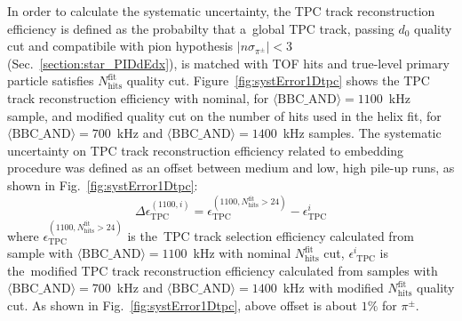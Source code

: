 In order to calculate the systematic uncertainty, the TPC track reconstruction efficiency is defined  as the probabilty that a~global TPC track, passing $d_0$ quality cut and compatibile with pion hypothesis $|n\sigma_{\pi^\pm}| < 3$ (Sec.~\ref{section:star_PIDdEdx}), is
matched with TOF hits and true-level primary particle satisfies $N^\textrm{fit}_\textrm{hits}$ quality cut. Figure~\ref{fig:systError1Dtpc} shows the TPC track reconstruction efficiency with nominal, for $\langle \textrm{BBC\_AND}\rangle=1100$~kHz sample, and modified quality cut on the  number of hits used in the helix fit, for $\langle\text{BBC\_AND}\rangle=700$~kHz and $\langle\text{BBC\_AND}\rangle=1400$~kHz  samples.
The systematic uncertainty on TPC track reconstruction efficiency related to embedding procedure was defined as an offset between medium and low, high pile-up runs, as shown in Fig.~\ref{fig:systError1Dtpc}:
\begin{equation}
\Delta\epsilon_\textrm{TPC}^{\left(1100,i\right)}=\epsilon_\textrm{TPC}^{\left(1100,N^\textrm{fit}_\textrm{hits}>24\right)}-\epsilon_\textrm{TPC}^i
\label{eq:tpcSystDifference}
\end{equation}
where $\epsilon_\textrm{TPC}^{\left(1100,N^\textrm{fit}_\textrm{hits}>24\right)}$ is the~TPC track selection efficiency calculated from sample with $\langle \textrm{BBC\_AND}\rangle=1100$~kHz with nominal $N^\textrm{fit}_\textrm{hits}$ cut, $\epsilon_\textrm{ TPC}^i$ is the~modified TPC track reconstruction efficiency calculated from samples with $\langle\text{BBC\_AND}\rangle=700$~kHz and $\langle\text{BBC\_AND}\rangle=1400$~kHz with modified $N^\textrm{fit}_\textrm{hits}$ quality cut. As shown in Fig.~\ref{fig:systError1Dtpc}, above offset is about $1\%$ for $\pi^\pm$. 

